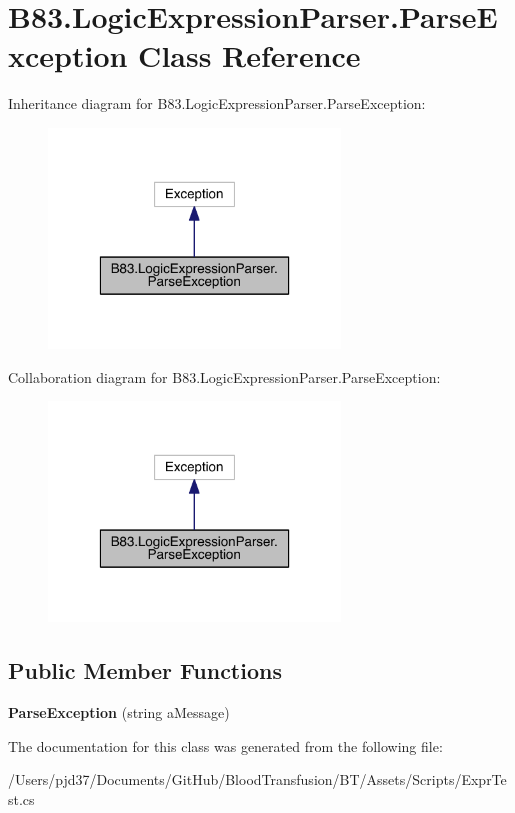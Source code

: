 \hypertarget{class_b83_1_1_logic_expression_parser_1_1_parse_exception}{}\section{B83.\+Logic\+Expression\+Parser.\+Parse\+Exception Class Reference}
\label{class_b83_1_1_logic_expression_parser_1_1_parse_exception}


Inheritance diagram for B83.\+Logic\+Expression\+Parser.\+Parse\+Exception\+:\nopagebreak
\begin{figure}[H]
\begin{center}
\leavevmode
\includegraphics[width=220pt]{class_b83_1_1_logic_expression_parser_1_1_parse_exception__inherit__graph}
\end{center}
\end{figure}


Collaboration diagram for B83.\+Logic\+Expression\+Parser.\+Parse\+Exception\+:\nopagebreak
\begin{figure}[H]
\begin{center}
\leavevmode
\includegraphics[width=220pt]{class_b83_1_1_logic_expression_parser_1_1_parse_exception__coll__graph}
\end{center}
\end{figure}
\subsection*{Public Member Functions}
\begin{DoxyCompactItemize}
\item 
{\bfseries Parse\+Exception} (string a\+Message)\hypertarget{class_b83_1_1_logic_expression_parser_1_1_parse_exception_ad12ec6c3ef57215003d3eacdd9394eb2}{}\label{class_b83_1_1_logic_expression_parser_1_1_parse_exception_ad12ec6c3ef57215003d3eacdd9394eb2}

\end{DoxyCompactItemize}


The documentation for this class was generated from the following file\+:\begin{DoxyCompactItemize}
\item 
/\+Users/pjd37/\+Documents/\+Git\+Hub/\+Blood\+Transfusion/\+B\+T/\+Assets/\+Scripts/Expr\+Test.\+cs\end{DoxyCompactItemize}
